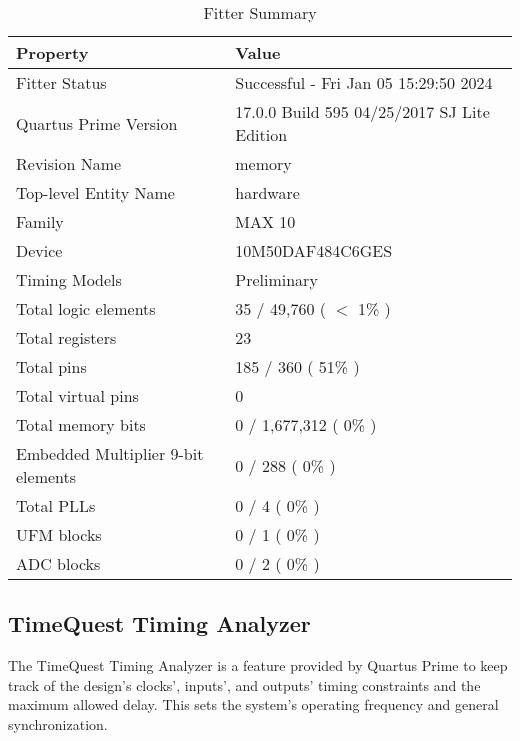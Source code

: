 \begin{table}[H]
	\centering
	\caption{Fitter Summary}
	\begin{tabular}{|l|l|}
		\hline
		\textbf{Property} & \textbf{Value} \\
		\hline
		Fitter Status & Successful - Fri Jan 05 15:29:50 2024 \\
		Quartus Prime Version & 17.0.0 Build 595 04/25/2017 SJ Lite Edition \\
		Revision Name & memory \\
		Top-level Entity Name & hardware \\
		Family & MAX 10 \\
		Device & 10M50DAF484C6GES \\
		Timing Models & Preliminary \\
		Total logic elements & 35 / 49,760 ( $<$ 1\% ) \\
		Total registers & 23 \\
		Total pins & 185 / 360 ( 51\% ) \\
		Total virtual pins & 0 \\
		Total memory bits & 0 / 1,677,312 ( 0\% ) \\
		Embedded Multiplier 9-bit elements & 0 / 288 ( 0\% ) \\
		Total PLLs & 0 / 4 ( 0\% ) \\
		UFM blocks & 0 / 1 ( 0\% ) \\
		ADC blocks & 0 / 2 ( 0\% ) \\
		\hline
	\end{tabular}
\end{table}

\subsection{TimeQuest Timing Analyzer}
\par The TimeQuest Timing Analyzer is a feature provided by Quartus Prime to keep track of the design's clocks', inputs', and outputs' timing constraints and the maximum allowed delay. This sets the system's operating frequency and general synchronization. \newline

\begin{comment}
	\begin{figure}[H]
		\centering
		\texttt{[image: timequest clocks.png]}
		\caption{ Clock Details in TimeQuest Timing Analyzer }
		\label{fig:discussionclocks}  
	\end{figure}
\end{comment}

